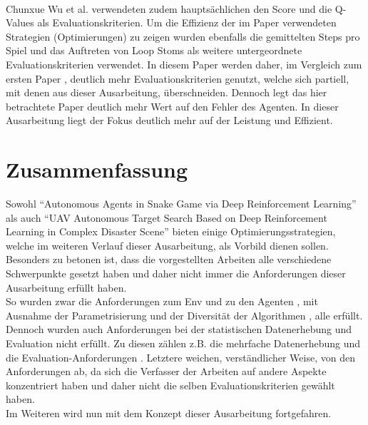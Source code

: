 \\Chunxue Wu et al. verwendeten zudem hauptsächlichen den Score und die Q-Values als Evaluationskriterien. Um die Effizienz der im Paper verwendeten Strategien (Optimierungen) zu zeigen wurden ebenfalls die gemittelten Steps pro Spiel und das Auftreten von Loop Stoms als weitere untergeordnete Evaluationskriterien verwendet. In diesem Paper werden daher, im Vergleich zum ersten Paper , deutlich mehr Evaluationskriterien genutzt, welche sich partiell, mit denen aus dieser Ausarbeitung, überschneiden. Dennoch legt das hier betrachtete Paper deutlich mehr Wert auf den Fehler des Agenten. In dieser Ausarbeitung liegt der Fokus deutlich mehr auf der Leistung und Effizient.


\section{Zusammenfassung} \label{sec:Verwandte_Arbeiten_Zusammenfassung}
Sowohl "`Autonomous Agents in Snake Game via Deep Reinforcement Learning"'  als auch "`UAV Autonomous Target Search Based on Deep Reinforcement Learning in Complex Disaster Scene"'  bieten einige Optimierungsstrategien, welche im weiteren Verlauf dieser Ausarbeitung, als Vorbild dienen sollen.\\
Besonders zu betonen ist, dass die vorgestellten Arbeiten alle verschiedene Schwerpunkte gesetzt haben und daher nicht immer die Anforderungen dieser Ausarbeitung erfüllt haben.\\ 
So wurden zwar die Anforderungen zum Env  und zu den Agenten , mit Ausnahme der Parametrisierung  und der Diversität der Algorithmen , alle erfüllt. Dennoch wurden auch Anforderungen bei der statistischen Datenerhebung und Evaluation nicht erfüllt. Zu diesen zählen z.B. die mehrfache Datenerhebung  und die Evaluation-Anforderungen . Letztere weichen, verständlicher Weise, von den Anforderungen ab, da sich die Verfasser der Arbeiten auf andere Aspekte konzentriert haben und daher nicht die selben Evaluationskriterien gewählt haben.\\
Im Weiteren wird nun mit dem Konzept dieser Ausarbeitung fortgefahren.